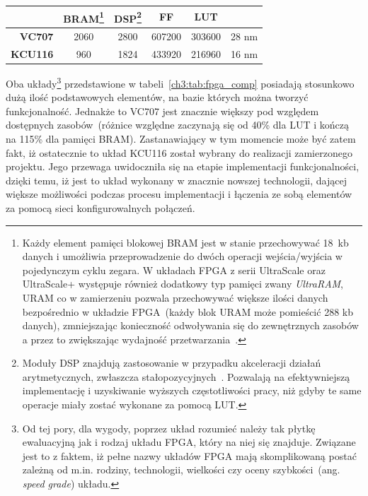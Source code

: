 \begin{enumerate}
\begin{savenotes}
\begin{table}[H]
\begin{tabular}{|r|c|c|c|c|c|}
                  & BRAM\footnote{Każdy element pamięci blokowej BRAM jest w stanie przechowywać 18~kb danych i umożliwia przeprowadzenie do dwóch operacji wejścia/wyjścia w pojedynczym cyklu zegara. W układach FPGA z serii UltraScale oraz UltraScale+ występuje również dodatkowy typ pamięci zwany \textit{UltraRAM}, URAM co w zamierzeniu pozwala przechowywać większe ilości danych bezpośrednio w układzie FPGA~(każdy blok URAM może pomieścić 288 kb danych), zmniejszając konieczność odwoływania się do zewnętrznych zasobów a przez to zwiększając wydajność przetwarzania~\cite{UG573}. }      & DSP\footnote{Moduły DSP znajdują zastosowanie w przypadku akceleracji działań arytmetycznych, zwłaszcza stałopozycyjnych~\cite{DSP48E1}\cite{DSP48E2}. Pozwalają na efektywniejszą implementację i uzyskiwanie wyższych częstotliwości pracy, niż gdyby te same operacje miały zostać wykonane za pomocą LUT.}       & FF         & LUT        &                                                                                 \\ \hline
\textbf{VC707}    & 2060      & 2800      & 607200     & 303600     & 28 nm                                                                   \\ \hline
\textbf{KCU116}   & 960       & 1824      & 433920     & 216960     & 16 nm                                                                \\ \hline
\end{tabular}
\end{table}
\end{savenotes}
Oba układy\footnote{Od tej pory, dla wygody, poprzez układ rozumieć należy tak płytkę ewaluacyjną jak i rodzaj układu FPGA, który na niej się znajduje. Związane jest to z faktem, iż pełne nazwy układów FPGA mają skomplikowaną postać zależną od m.in. rodziny, technologii, wielkości czy oceny szybkości~(ang. \textit{speed grade}) układu.} przedstawione w tabeli~\ref{ch3:tab:fpga_comp} posiadają stosunkowo dużą ilość podstawowych elementów, na bazie których można tworzyć funkcjonalność. Jednakże to VC707 jest znacznie większy pod względem dostępnych zasobów~(różnice względne zaczynają się od 40\% dla LUT i kończą na 115\% dla pamięci BRAM). Zastanawiający w tym momencie może być zatem fakt, iż ostatecznie to układ KCU116 został wybrany do realizacji zamierzonego projektu. Jego przewaga uwidoczniła się na etapie implementacji funkcjonalności, dzięki temu, iż jest to układ wykonany w znacznie nowszej technologii, dającej większe możliwości podczas procesu implementacji i łączenia ze sobą elementów za pomocą sieci konfigurowalnych połączeń.

\end{enumerate}

